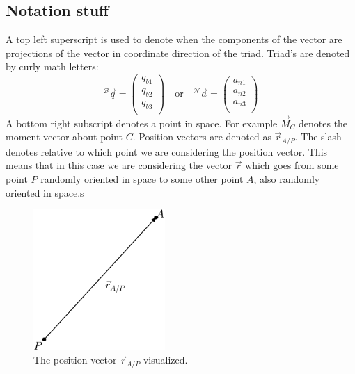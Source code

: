 \documentclass[11pt, a4paper]{article}
\begin{document}
\subsection{Notation stuff}
A top left superscript is used to denote when the components of the vector are projections of the vector in coordinate direction of the triad. Triad's are denoted by curly math letters:
\begin{equation}
  ^{\mathcal{B}}\vec{q} = \begin{pmatrix} q_{b1}\\ q_{b2}\\ q_{b3}\\ \end{pmatrix}
  \quad \text{or} \quad
  ^{\mathcal{N}}\vec{a} = \begin{pmatrix} a_{n1}\\ a_{n2}\\ a_{n3}\\ \end{pmatrix}
\end{equation}
A bottom right subscript denotes a point in space. For example $\vec{M}_C$ denotes the moment vector about point $C$.
Position vectors are denoted as $\vec{r}_{A/P}$. The slash denotes relative to which point we are considering the position vector. This means that in this case we are considering the vector $\vec{r}$ which goes from some point $P$ randomly oriented in space to some other point $A$, also randomly oriented in space.s
\begin{figure}[h]
  \centerline{\includegraphics[width=50mm]{images/Position.png}}
  \caption{The position vector $\vec{r}_{A/P}$ visualized.}
\end{figure}
\end{document}
